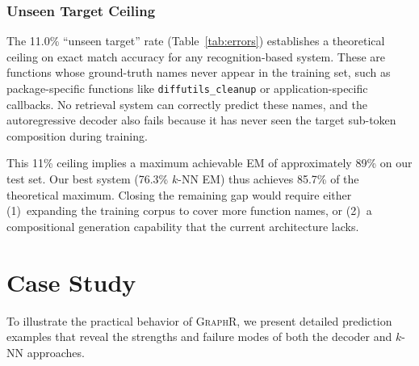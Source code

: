 \documentclass[sigconf,nonacm]{acmart}
\newcommand{\sysname}{\textsc{GraphR}}
\begin{document}
\subsubsection{Unseen Target Ceiling}

The 11.0\% ``unseen target'' rate (Table~\ref{tab:errors}) establishes a theoretical ceiling on exact match accuracy for any recognition-based system. These are functions whose ground-truth names never appear in the training set, such as package-specific functions like \texttt{diffutils\_cleanup} or application-specific callbacks. No retrieval system can correctly predict these names, and the autoregressive decoder also fails because it has never seen the target sub-token composition during training.

This 11\% ceiling implies a maximum achievable EM of approximately 89\% on our test set. Our best system (76.3\% $k$-NN EM) thus achieves 85.7\% of the theoretical maximum. Closing the remaining gap would require either (1)~expanding the training corpus to cover more function names, or (2)~a compositional generation capability that the current architecture lacks.

\section{Case Study}
\label{sec:casestudy}

To illustrate the practical behavior of \sysname{}, we present detailed prediction examples that reveal the strengths and failure modes of both the decoder and $k$-NN approaches.
\end{document}
